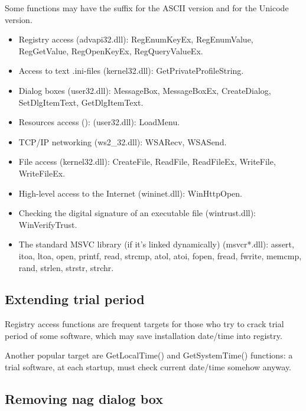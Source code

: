 Some functions may have the  suffix for the ASCII version and  for the Unicode version.

\begin{itemize}

\item
Registry access (advapi32.dll): 
RegEnumKeyEx, RegEnumValue, RegGetValue, RegOpenKeyEx, RegQueryValueEx.

\item
Access to text .ini-files (kernel32.dll): 
GetPrivateProfileString.

\item
Dialog boxes (user32.dll): 
MessageBox, MessageBoxEx, CreateDialog, SetDlgItemText, GetDlgItemText.

\item
Resources access (): (user32.dll): LoadMenu.

\item
TCP/IP networking (ws2\_32.dll):
WSARecv, WSASend.

\item
File access (kernel32.dll):
CreateFile, ReadFile, ReadFileEx, WriteFile, WriteFileEx.

\item
High-level access to the Internet (wininet.dll): WinHttpOpen.

\item
Checking the digital signature of an executable file (wintrust.dll):
WinVerifyTrust.

\item
The standard MSVC library (if it's linked dynamically) (msvcr*.dll):
assert, itoa, ltoa, open, printf, read, strcmp, atol, atoi, fopen, fread, fwrite, memcmp, rand,
strlen, strstr, strchr.

\end{itemize}

\subsection{Extending trial period}

Registry access functions are frequent targets for those who try to crack trial period of some software, which may save
installation date/time into registry.

Another popular target are GetLocalTime() and GetSystemTime() functions:
a trial software, at each startup, must check current date/time somehow anyway.

\subsection{Removing nag dialog box}

